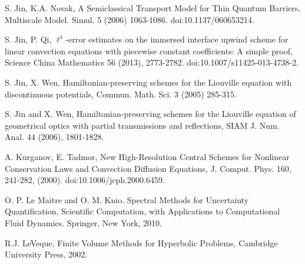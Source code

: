 \documentclass[12pt]{article}
\theoremstyle{plain}
\theoremstyle{remark}
\theoremstyle{remark}
\theoremstyle{remark}
\numberwithin{equation}{section}
\begin{document}
\begin{thebibliography}{00}
 S. Jin, K.A. Novak, A Semiclassical Transport Model for Thin Quantum Barriers, Multiscale Model. Simul. 5 (2006) 1063-1086. doi:10.1137/060653214.

 S. Jin, P. Qi, $\ell^1$-error estimates on the immersed interface upwind scheme for linear convection equations with piecewise constant coefficients: A simple proof, Science China Mathematics 56 (2013), 2773-2782. doi:10.1007/s11425-013-4738-2.



 S. Jin, X. Wen, Hamiltonian-preserving schemes for the Liouville equation with discontinuous potentials, Commun. Math. Sci. 3 (2005) 285-315.

 S. Jin and X. Wen, Hamiltonian-preserving schemes for the Liouville equation of geometrical optics with partial transmissions and reflections, SIAM J. Num. Anal. 44 (2006), 1801-1828.

 A. Kurganov, E. Tadmor, New High-Resolution Central Schemes for Nonlinear Conservation Laws and Convection Diffusion Equations, J. Comput. Phys. 160, 241-282, (2000). doi:10.1006/jcph.2000.6459.

 O. P. Le Maitre and O. M. Knio. Spectral Methods for Uncertainty Quantification, Scientific
Computation, with Applications to Computational Fluid Dynamics. Springer, New York,
2010.



 R.J. LeVeque, Finite Volume Methods for Hyperbolic Problems,
Cambridge University Press, 2002.



\end{thebibliography}
\end{document}
